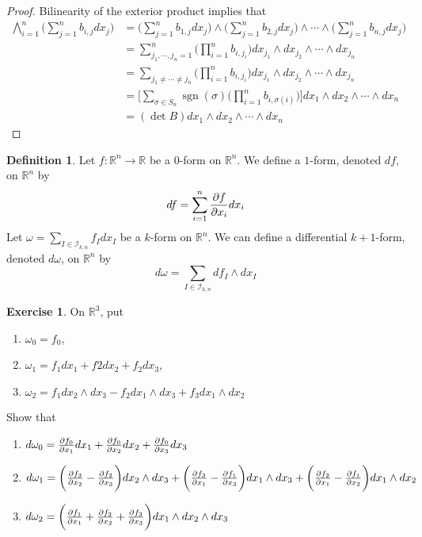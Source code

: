 \documentclass[12pt]{amsart}
\theoremstyle{definition}
\newtheorem{defn}[definition]{Definition}
\theoremstyle{definition}
\newtheorem{ex}[definition]{Exercise}
\newcommand{\sig}{\sigma}
\newcommand{\om}{\omega}
\newcommand{\R}{\mathbb{R}}
\newcommand{\MI}{\mathcal{I}}
\DeclareMathOperator{\sgn}{sgn}
\begin{document}
	\begin{proof}
		Bilinearity of the exterior product implies that
		\begin{align*}
			\bigwedge_{i=1}^n \bigg(\sum_{j=1}^n b_{i,j}dx_j\bigg)
			 &=\bigg(\sum_{j=1}^n b_{1,j}dx_j\bigg) \wedge \bigg(\sum_{j=1}^n b_{2,j}dx_j\bigg) \wedge \cdots \wedge \bigg(\sum_{j=1}^n b_{n,j}dx_j\bigg) \\
			 &= \sum_{j_1, \cdots, j_n = 1}^n \bigg( \prod_{i=1}^n b_{i, j_i} \bigg) dx_{j_1}\wedge  dx_{j_2} \wedge \cdots \wedge  dx_{j_n} \\
			 &= \sum_{j_1 \neq \cdots \neq j_n} \bigg( \prod_{i=1}^n b_{i, j_i} \bigg) dx_{j_1}\wedge  dx_{j_2} \wedge \cdots \wedge  dx_{j_n} \\
			 &= \bigg[ \sum_{\sig \in S_n} \sgn(\sig) \bigg(\prod_{i=1}^n b_{i, \sig(i)} \bigg) \bigg] dx_{1}\wedge  dx_{2} \wedge \cdots \wedge  dx_{n} \\
			 &= (\det B) dx_{1}\wedge  dx_{2} \wedge \cdots \wedge  dx_{n}
		\end{align*} 
		
	\end{proof}

	\begin{defn}
		Let $f: \R^n \rightarrow \R$ be a $0$-form on $\R^n$. We define a $1$-form, denoted $df$, on $\R^n$ by $$df = \sum_{i = 1}^n \pdv{f}{x_i} dx_i$$
		Let $\om = \sum\limits_{I \in \MI_{k,n}} f_Idx_I$ be a $k$-form on $\R^n$. We can define a differential $k+1$-form, denoted $d \om$, on $\R^n$ by $$d\om = \sum\limits_{I \in \MI_{k,n}} df_I\wedge dx_I$$  
	\end{defn}

	\begin{ex}
		On $\R^3$, put 
		\begin{enumerate}
			\item $\om_0 = f_0$, 
			\item $\om_1 = f_1 dx_1 + f2 dx_2 + f_2 dx_3$, 
			\item $\om_2 = f_1dx_2\wedge dx_3 - f_2 dx_1 \wedge dx_3 + f_3 dx_1 \wedge dx_2$
		\end{enumerate} 
		Show that
		\begin{enumerate}
			\item $d\om_0 = \pdv{f_0}{x_1}dx_1 + \pdv{f_0}{x_2}dx_2 + \pdv{f_0}{x_3}dx_3$
			\item $d \om_1 = \bigg(\pdv{f_3}{x_2} - \pdv{f_2}{x_3} \bigg) dx_2 \wedge dx_3 + \bigg( \pdv{f_3}{x_1} - \pdv{f_1}{x_3}\bigg)dx_1 \wedge dx_3 + \bigg( \pdv{f_2}{x_1} - \pdv{f_1}{x_2} \bigg) dx_1 \wedge dx_2$
			\item $d \om_2 = \bigg( \pdv{f_1}{x_1} + \pdv{f_2}{x_2} + \pdv{f_3}{x_3} \bigg) dx_1 \wedge dx_2 \wedge dx_3$ 
		\end{enumerate}
	\end{ex}
\end{document}
